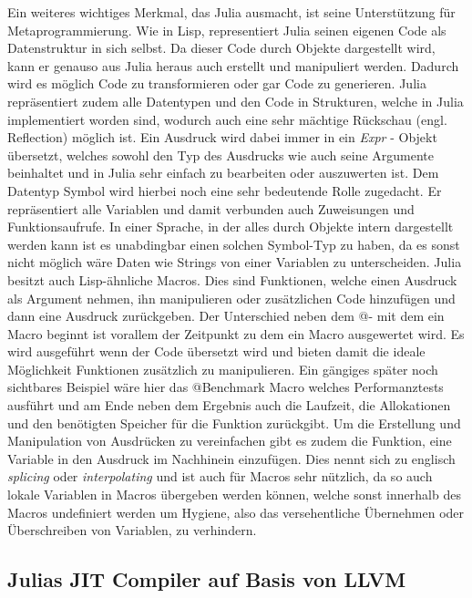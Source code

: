 \documentclass[proseminar,german,utf8]{zihpub}
\begin{document}
Ein weiteres wichtiges Merkmal, das Julia ausmacht, ist seine Unterstützung für Metaprogrammierung. Wie in Lisp, representiert Julia seinen eigenen Code als Datenstruktur in sich selbst. Da dieser Code durch Objekte dargestellt wird, kann er genauso aus Julia heraus auch erstellt und manipuliert werden. Dadurch wird es möglich Code zu transformieren oder gar Code zu generieren. Julia repräsentiert zudem alle Datentypen und den Code in Strukturen, welche in Julia implementiert worden sind, wodurch auch eine sehr mächtige Rückschau (engl. Reflection) möglich ist. Ein Ausdruck wird dabei immer in ein \textit{Expr} - Objekt übersetzt, welches sowohl den Typ des Ausdrucks wie auch seine Argumente beinhaltet und in Julia sehr einfach zu bearbeiten oder auszuwerten ist. Dem Datentyp Symbol wird hierbei noch eine sehr bedeutende Rolle zugedacht. Er repräsentiert alle Variablen und damit verbunden auch Zuweisungen und Funktionsaufrufe. In einer Sprache, in der alles durch Objekte intern dargestellt werden kann ist es unabdingbar einen solchen Symbol-Typ zu haben, da es sonst nicht möglich wäre Daten wie Strings von einer Variablen zu unterscheiden. Julia besitzt auch Lisp-ähnliche Macros. Dies sind Funktionen, welche einen Ausdruck als Argument nehmen, ihn manipulieren oder zusätzlichen Code hinzufügen und dann eine Ausdruck zurückgeben. Der Unterschied neben dem @- mit dem ein Macro beginnt ist vorallem der Zeitpunkt zu dem ein Macro ausgewertet wird. Es wird ausgeführt wenn der Code übersetzt wird und bieten damit die ideale Möglichkeit Funktionen zusätzlich zu manipulieren. Ein gängiges später noch sichtbares Beispiel wäre hier das @Benchmark Macro welches Performanztests ausführt und am Ende neben dem Ergebnis auch die Laufzeit, die Allokationen und den benötigten Speicher für die Funktion zurückgibt. Um die Erstellung und Manipulation von Ausdrücken zu vereinfachen gibt es zudem die Funktion, eine Variable in den Ausdruck im Nachhinein einzufügen. Dies nennt sich zu englisch \textit{splicing} oder \textit{interpolating} und ist auch für Macros sehr nützlich, da so auch lokale Variablen in Macros übergeben werden können, welche sonst innerhalb des Macros undefiniert werden um Hygiene, also das versehentliche Übernehmen oder Überschreiben von Variablen, zu verhindern.

\subsection{Julias JIT Compiler auf Basis von LLVM}
\end{document}
